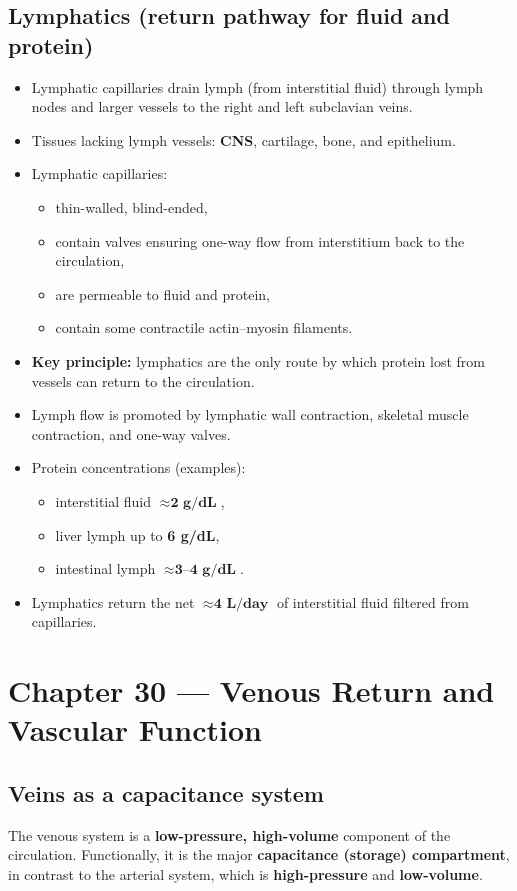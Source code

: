 \documentclass[11pt,a4paper]{article}
\begin{document}
\subsection{Lymphatics (return pathway for fluid and protein)}
\begin{itemize}
\item Lymphatic capillaries drain lymph (from interstitial fluid) through lymph nodes and larger vessels to the right and left subclavian veins.
\item Tissues lacking lymph vessels: \textbf{CNS}, cartilage, bone, and epithelium.
\item Lymphatic capillaries:
  \begin{itemize}
  \item thin-walled, blind-ended,
  \item contain valves ensuring one-way flow from interstitium back to the circulation,
  \item are permeable to fluid and protein,
  \item contain some contractile actin--myosin filaments.
  \end{itemize}
\item \textbf{Key principle:} lymphatics are the only route by which protein lost from vessels can return to the circulation.
\item Lymph flow is promoted by lymphatic wall contraction, skeletal muscle contraction, and one-way valves.
\item Protein concentrations (examples):
  \begin{itemize}
  \item interstitial fluid $\approx \textbf{2 g/dL}$,
  \item liver lymph up to \textbf{6 g/dL},
  \item intestinal lymph $\approx \textbf{3--4 g/dL}$.
  \end{itemize}
\item Lymphatics return the net $\approx \textbf{4 L/day}$ of interstitial fluid filtered from capillaries.
\end{itemize}

\section{Chapter 30 --- Venous Return and Vascular Function}

\subsection{Veins as a capacitance system}
The venous system is a \textbf{low-pressure, high-volume} component of the circulation. Functionally, it is the major \textbf{capacitance (storage) compartment}, in contrast to the arterial system, which is \textbf{high-pressure} and \textbf{low-volume}.
\end{document}
